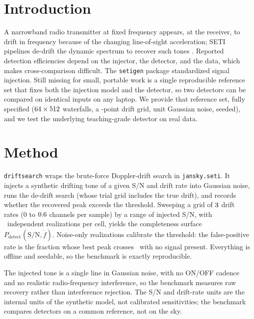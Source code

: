 \documentclass[twocolumn]{aastex631}
\newcommand{\code}[1]{\texttt{#1}}
\begin{document}
\section{Introduction}
A narrowband radio transmitter at fixed frequency appears, at the receiver, to drift in frequency
because of the changing line-of-sight acceleration; SETI pipelines de-drift the dynamic spectrum to
recover such tones \citep{enriquez2017}. Reported detection efficiencies depend on the injector, the
detector, and the data, which makes cross-comparison difficult. The \code{setigen} package
\citep{brzycki2022} standardized signal injection. Still missing for small, portable work is a single
reproducible reference set that fixes both the injection model and the detector, so two detectors can be
compared on identical inputs on any laptop. We provide that reference set, fully specified ($64\times512$ waterfalls, a \dsNsearchDrifts-point drift grid, unit Gaussian noise, seeded), and we test the underlying teaching-grade detector on real data.

\section{Method}
\code{driftsearch} wraps the brute-force Doppler-drift search in \code{jansky.seti}. It injects a
synthetic drifting tone of a given S/N and drift rate into Gaussian noise, runs the de-drift search
(whose trial grid includes the true drift), and records whether the recovered peak exceeds the
threshold. Sweeping a grid of $3$ drift rates (0 to $0.6$ channels per sample) by a
range of injected S/N, with \dsNtrials\ independent realizations per cell, yields the completeness
surface $P_\mathrm{detect}(\mathrm{S/N}, \dot f)$. Noise-only realizations calibrate the threshold:
the false-positive rate is the fraction whose best peak crosses \dsThreshold\ with no signal present.
Everything is offline and seedable, so the benchmark is exactly reproducible.

The injected tone is a single line in Gaussian noise, with no ON/OFF cadence and no realistic
radio-frequency interference, so the benchmark measures raw recovery rather than interference
rejection. The S/N and drift-rate units are the internal units of the synthetic model, not calibrated
sensitivities; the benchmark compares detectors on a common reference, not on the sky.
\end{document}
